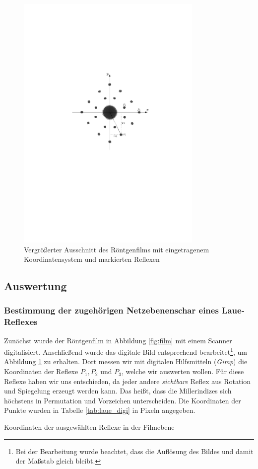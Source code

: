 \documentclass[11pt, a4paper]{article}
\begin{document}
\begin{figure}[h!]
\centering
\includegraphics[width=0.8\textwidth]{./grafiken/film_koord.pdf}
\caption{Vergrößerter Ausschnitt des Röntgenfilms mit eingetragenem Koordinatensystem und markierten Reflexen}
\label{fig:film_koord}
\end{figure}


\subsection{Auswertung}

\subsubsection{Bestimmung der zugehörigen Netzebenenschar eines Laue-Reflexes}
Zunächst wurde der Röntgenfilm in Abbildung \ref{fig:film} mit einem Scanner digitalisiert.
Anschließend wurde das digitale Bild entsprechend bearbeitet\footnote{Bei der Bearbeitung wurde beachtet, dass die Auflösung des Bildes und damit der Maßstab gleich bleibt.}, um Abbildung \ref{fig:film_koord} zu erhalten.
Dort messen wir mit digitalen Hilfsmitteln (\emph{Gimp}) die Koordinaten der Reflexe $P_1, P_2$ und $P_3$, welche wir auswerten wollen.
Für diese Reflexe haben wir uns entschieden, da jeder andere \emph{sichtbare} Reflex aus Rotation und Spiegelung erzeugt werden kann.
Das heißt, dass die Millerindizes sich höchstens in Permutation und Vorzeichen unterscheiden.
Die Koordinaten der Punkte wurden in Tabelle \ref{tab:laue_digi} in Pixeln angegeben.
\begin{table}[h]
\centering

\caption{Koordinaten der ausgewählten Reflexe in der Filmebene}
\label{tab:laue_digi}
\end{table}
\end{document}
